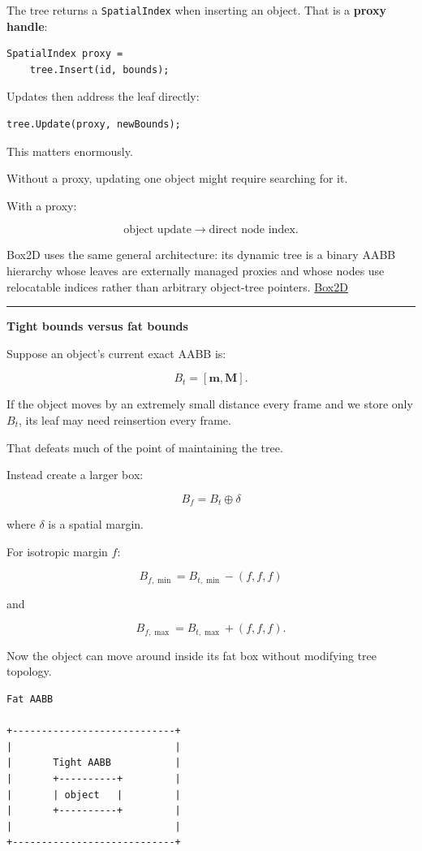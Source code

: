 The tree returns a \texttt{SpatialIndex} when inserting an object. That is a \textbf{proxy handle}:

\begin{verbatim}
SpatialIndex proxy =
    tree.Insert(id, bounds);
\end{verbatim}

Updates then address the leaf directly:

\begin{verbatim}
tree.Update(proxy, newBounds);
\end{verbatim}

This matters enormously.

Without a proxy, updating one object might require searching for it.

With a proxy:

\[
\text{object update}
\rightarrow
\text{direct node index}.
\]

Box2D uses the same general architecture: its dynamic tree is a binary AABB hierarchy whose leaves are externally managed proxies and whose nodes use relocatable indices rather than arbitrary object-tree pointers. \href{https://box2d.org/documentation/group__tree.html?utm_source=chatgpt.com}{Box2D}

\begin{center}\rule{0.5\linewidth}{0.5pt}\end{center}

\textbf{Tight bounds versus fat bounds}

Suppose an object's current exact AABB is:

\[
B_t=
[\mathbf m,\mathbf M].
\]

If the object moves by an extremely small distance every frame and we store only \(B_t\), its leaf may need reinsertion every frame.

That defeats much of the point of maintaining the tree.

Instead create a larger box:

\[
B_f=B_t\oplus \delta
\]

where \(\delta\) is a spatial margin.

For isotropic margin \(f\):

\[
B_{f,\min}
=
B_{t,\min}-(f,f,f)
\]

and

\[
B_{f,\max}
=
B_{t,\max}+(f,f,f).
\]

Now the object can move around inside its fat box without modifying tree topology.

\begin{verbatim}
Fat AABB

+----------------------------+
|                            |
|       Tight AABB           |
|       +----------+         |
|       | object   |         |
|       +----------+         |
|                            |
+----------------------------+
\end{verbatim}

